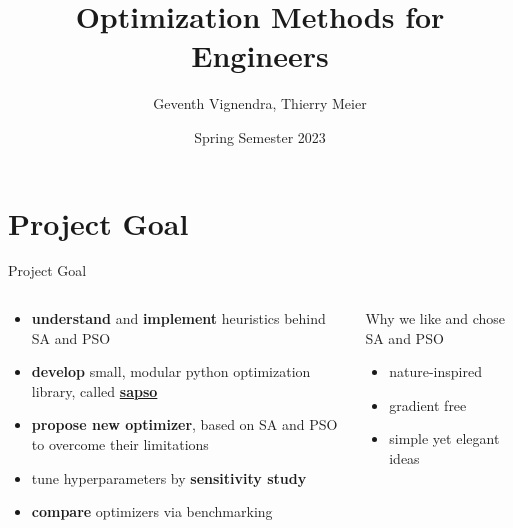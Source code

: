 \documentclass[11pt,aspectratio=169]{beamer}
\title{Optimization Methods for Engineers}
\date[July 2023]{Spring Semester 2023}
\author{Geventh Vignendra, Thierry Meier}
\institute{Optimization Methods for Engineers\\227-0707-00L}
\begin{document}
\def\titlefigure{elements/eggholder.pdf}        %

%
%

\titleframe

%
%

\tocframe

%
%

\section{Project Goal}

%
%

\begin{frame}[fragile]{Project Goal}
    \begin{columns}
    \begin{column}{0.5\textwidth}


        \begin{itemize}
            \item \textbf{understand} and \textbf{implement} heuristics behind SA and PSO
            \item \textbf{develop} small, modular python optimization library, called \href{https://github.com/Geventh/Optimization-Methods/tree/main/sapso}{\textcolor{accentcolor}{\textbf{sapso}}}
            \item \textbf{propose new optimizer}, based on SA and PSO to overcome their limitations
            \item tune hyperparameters by \textbf{sensitivity study}
            \item \textbf{compare} optimizers via benchmarking
        \end{itemize}

    \end{column}
    \begin{column}{0.5\textwidth}
        Why we like and chose SA and PSO
        \begin{itemize}
            \item nature-inspired
            \item gradient free
            \item simple yet elegant ideas
        \end{itemize}
    \end{column}
    \end{columns}
\end{frame}
\end{document}
